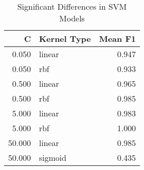 \begin{table}
\centering
\caption{Significant Differences in SVM Models}
\label{tab:svm_significant_pairs_mushroom}
\begin{tabular}{rlr}
\toprule
C & Kernel Type & Mean F1 \\
\midrule
0.050 & linear & 0.947 \\
0.050 & rbf & 0.933 \\
0.500 & linear & 0.965 \\
0.500 & rbf & 0.985 \\
5.000 & linear & 0.983 \\
5.000 & rbf & 1.000 \\
50.000 & linear & 0.985 \\
50.000 & sigmoid & 0.435 \\
\bottomrule
\end{tabular}
\end{table}
